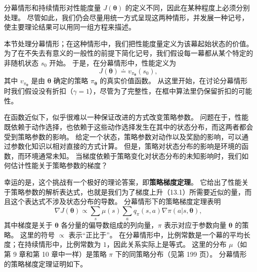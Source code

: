 \documentclass[UTF8, 12pt, fontset=fandol, oneside]{ctexart}
\begin{document}
分幕情形和持续情形对性能度量 $J(\boldsymbol{\theta})$ 的定义不同，因此在某种程度上必须分别处理。
尽管如此，我们仍会尽量用统一方式呈现这两种情形，并发展一种记号，使主要理论结果可以用同一组方程来描述。

本节处理分幕情形；在这种情形中，我们把性能度量定义为该幕起始状态的价值。
为了在不失去有意义的一般性的前提下简化记号，我们假设每一幕都从某个特定的非随机状态 $s_0$ 开始。
于是，在分幕情形中，性能定义为
\begin{equation}
J(\boldsymbol{\theta})\doteq v_{\pi_{\boldsymbol{\theta}}}(s_0),
\tag{13.4}
\end{equation}
其中 $v_{\pi_{\boldsymbol{\theta}}}$ 是由 $\boldsymbol{\theta}$ 确定的策略 $\pi_{\boldsymbol{\theta}}$ 的真实价值函数。
从这里开始，在讨论分幕情形时我们假设没有折扣（$\gamma=1$），尽管为了完整性，在框中算法里仍保留折扣的可能性。

在函数近似下，似乎很难以一种保证改进的方式改变策略参数。
问题在于，性能既依赖于动作选择，也依赖于这些动作选择发生在其中的状态分布，而这两者都会受到策略参数的影响。
给定一个状态，策略参数对动作以及奖励的影响，可以通过参数化知识以相对直接的方式计算。
但是，策略对状态分布的影响是环境的函数，而环境通常未知。
当梯度依赖于策略变化对状态分布的未知影响时，我们如何估计性能关于策略参数的梯度？

幸运的是，这个挑战有一个极好的理论答案，即\textbf{策略梯度定理}。
它给出了性能关于策略参数的解析表达式，也就是我们为了梯度上升（13.1）所需要近似的量，而且这个表达式不涉及状态分布的导数。
分幕情形下的策略梯度定理表明
\begin{equation}
\nabla J(\boldsymbol{\theta})\propto
\sum_s \mu(s)\sum_a q_\pi(s,a)\nabla\pi(a|s,\boldsymbol{\theta}),
\tag{13.5}
\end{equation}
其中梯度是关于 $\boldsymbol{\theta}$ 各分量的偏导数组成的列向量，$\pi$ 表示对应于参数向量 $\boldsymbol{\theta}$ 的策略。
这里的符号 $\propto$ 表示“正比于”。
在分幕情形中，比例常数是一个幕的平均长度；在持续情形中，比例常数为 $1$，因此关系实际上是等式。
这里的分布 $\mu$（如第 9 章和第 10 章中一样）是策略 $\pi$ 下的同策略分布（见第 199 页）。
分幕情形的策略梯度定理证明如下。
\end{document}
